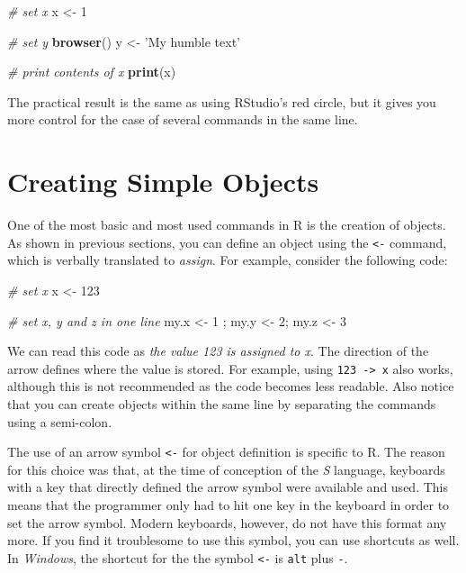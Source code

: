 \documentclass[11pt,]{book}
\newenvironment{Shaded}{\begin{snugshade}}{\end{snugshade}}
\newcommand{\KeywordTok}[1]{\textcolor[rgb]{0.27,0.27,0.27}{\textbf{#1}}}
\newcommand{\DecValTok}[1]{\textcolor[rgb]{0.06,0.06,0.06}{#1}}
\newcommand{\StringTok}[1]{\textcolor[rgb]{0.5,0.5,0.5}{#1}}
\newcommand{\CommentTok}[1]{\textcolor[rgb]{0.56,0.35,0.01}{\textit{#1}}}
\newcommand{\NormalTok}[1]{#1}
\begin{document}
\begin{Shaded}
\begin{Highlighting}[]
\CommentTok{# set x}
\NormalTok{x <-}\StringTok{ }\DecValTok{1}

\CommentTok{# set y}
\KeywordTok{browser}\NormalTok{()}
\NormalTok{y <-}\StringTok{ 'My humble text'}

\CommentTok{# print contents of x}
\KeywordTok{print}\NormalTok{(x)}
\end{Highlighting}
\end{Shaded}

The practical result is the same as using RStudio's red circle, but it
gives you more control for the case of several commands in the same
line.

\section{Creating Simple Objects}\label{creating-simple-objects}

One of the most basic and most used commands in R is the creation of
objects. As shown in previous sections, you can define an object using
the \texttt{\textless{}-} command, which is verbally translated to
\emph{assign}. For example, consider the following code: 

\begin{Shaded}
\begin{Highlighting}[]
\CommentTok{# set x}
\NormalTok{x <-}\StringTok{ }\DecValTok{123}

\CommentTok{# set x, y and z in one line}
\NormalTok{my.x <-}\StringTok{ }\DecValTok{1}\NormalTok{ ; my.y <-}\StringTok{ }\DecValTok{2}\NormalTok{; my.z <-}\StringTok{ }\DecValTok{3}
\end{Highlighting}
\end{Shaded}

We can read this code as \emph{the value 123 is assigned to x}. The
direction of the arrow defines where the value is stored. For example,
using \texttt{123\ -\textgreater{}\ x} also works, although this is not
recommended as the code becomes less readable. Also notice that you can
create objects within the same line by separating the commands using a
semi-colon.

The use of an arrow symbol \texttt{\textless{}-} for object definition
is specific to R. The reason for this choice was that, at the time of
conception of the \emph{S} language, keyboards with a key that directly
defined the arrow symbol were available and used. This means that the
programmer only had to hit one key in the keyboard in order to set the
arrow symbol. Modern keyboards, however, do not have this format any
more. If you find it troublesome to use this symbol, you can use
shortcuts as well. In \emph{Windows}, the shortcut for the the symbol
\texttt{\textless{}-} is \texttt{alt} plus \texttt{-}.
\end{document}
